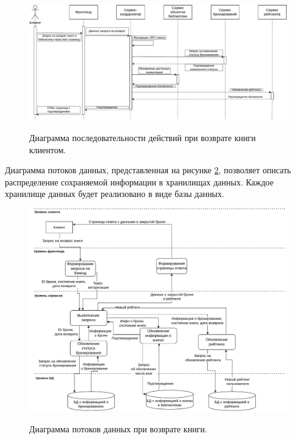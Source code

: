 \documentclass[a4paper, 12pt]{article}
\begin{document}
\begin{large}
\begin{landscape}
\begin{figure}[h!]
	\begin{center}
		{\includegraphics[scale = 0.9]{Sequence}}
		\caption{Диаграмма последовательности действий при возврате книги клиентом.}
		\label{fig:flow-level1}
	\end{center}
\end{figure}

\pagebreak
\end{landscape}

Диаграмма потоков данных, представленная на рисунке \ref{fig:data_flow}, позволяет описать распределение сохраняемой информации в хранилищах данных. Каждое хранилище данных будет реализовано в виде базы данных.

\begin{figure}[h!]
	\begin{center}
		{\includegraphics[scale = 0.75]{DataFlow}}
		\caption{Диаграмма потоков данных при возврате книги.}
		\label{fig:data_flow}
	\end{center}
\end{figure} 


\end{large}
\end{document}
